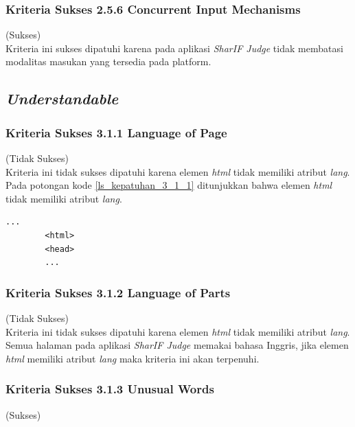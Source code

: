 \documentclass[a4paper,twoside]{article}
\begin{document}
\begin{enumerate}
		\subsubsection*{Kriteria Sukses 2.5.6 Concurrent Input Mechanisms}
		\label{subsubsec:kepatuhan_kriteria_2.5.6}
		(Sukses) \\
		
		Kriteria ini sukses dipatuhi karena pada aplikasi \textit{SharIF Judge} tidak membatasi modalitas masukan yang tersedia pada platform.
		
		\subsection*{\textit{Understandable}}
		\label{subsec:kepatuhan_understandable}
		
		\subsubsection*{Kriteria Sukses 3.1.1 Language of Page}
		\label{subsubsec:kepatuhan_kriteria_3.1.1}
		(Tidak Sukses) \\
		
		Kriteria ini tidak sukses dipatuhi karena elemen \textit{html} tidak memiliki atribut \textit{lang}. Pada potongan kode \ref{ls_kepatuhan_3_1_1} ditunjukkan bahwa elemen \textit{html} tidak memiliki atribut \textit{lang}.
		\begin{lstlisting}[basicstyle=\ttfamily, frame=single,
		columns=fullflexible, keepspaces=true, breaklines=true, label=ls_kepatuhan_3_1_1, caption=Kriteria Sukses 3.1.1 - Elemen \textit{HTML}]
		...
		<html>
		<head>
		...
		\end{lstlisting}
		
		\subsubsection*{Kriteria Sukses 3.1.2 Language of Parts}
		\label{subsubsec:kepatuhan_kriteria_3.1.2}
		(Tidak Sukses) \\
		
		Kriteria ini tidak sukses dipatuhi karena elemen \textit{html} tidak memiliki atribut \textit{lang}. Semua halaman pada aplikasi \textit{SharIF Judge} memakai bahasa Inggris, jika elemen \textit{html} memiliki atribut \textit{lang} maka kriteria ini akan terpenuhi.
		
		\subsubsection*{Kriteria Sukses 3.1.3 Unusual Words}
		\label{subsubsec:kepatuhan_kriteria_3.1.3}
		(Sukses) \\
		

\end{enumerate}
\end{document}
